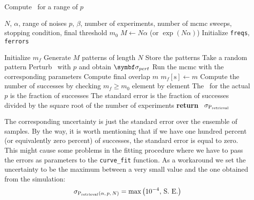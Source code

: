 \documentclass[\rootdir/main.tex]{subfiles}
\begin{document}
\begin{algorithm}
    \caption{Compute \pretshort\ for a range of $p$}
    \label{alg:retrieval}
    \begin{algorithmic}[1]
    \Require $N$, $\alpha$, range of noises $p$, $\beta$, number of experiments, number of \acrshort{mcmc} sweeps, stopping condition, final threshold $m_0$
    \State $M \gets N\alpha$ \quad (or $\exp(N\alpha)$)
    \State Initialize \texttt{freqs}, \texttt{ferrors} 

        \State Initialize $m_f$ 
            \State Generate $M$ patterns of length $N$
            \State Store the patterns 
            \State Take a random pattern \bxi
            \State Perturb \bxi\ with $p$ and obtain $\bsigma_{pert}$
            \State Run the \acrshort{mcmc} with the corresponding parameters
            \State Compute final overlap $m$
            \State $m_f[\text{s}] \gets m$
        \EndFor
        \State Compute the number of successes by checking $m_f \geq m_0$ element by element
        \State The \pretshort\ for the actual $p$ is the fraction of successes
        \State The standard error is the fraction of successes divided by the square root of the number of experiments
    \EndFor
    \State \textbf{return} \pretshort\, $\sigma_{ \mathrm{P}_{\text{retrieval}} }$
    \end{algorithmic}
\end{algorithm}

The corresponding uncertainty is just the standard error over the ensemble of samples. By the way, it is worth mentioning that if we have one hundred percent (or equivalently zero percent) of successes, the standard error is equal to zero. This might cause some problems in the fitting procedure where we have to pass the errors as parameters to the \texttt{curve\_fit} function. As a workaround we set the uncertainty to be the maximum between a very small value and the one obtained from the simulation:
\begin{equation*}
    \sigma_{ \mathrm{P}_{\text{retrieval}} \left( \alpha, \, p, \, N \right) } = \max\left(10^{-4}, \, \text{S. E.}\right)
\end{equation*}
\end{document}
